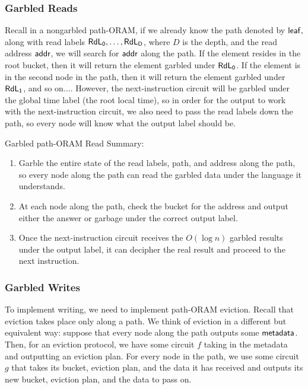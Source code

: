 \subsubsection{Garbled Reads}
Recall in a nongarbled path-ORAM, if we already know the path denoted by $\mathsf{leaf},$ along with read labels $\mathsf{RdL_0},\dots,\mathsf{RdL_D}$, where $D$ is the depth, and the read address $\mathsf{addr}$, we will search for $\mathsf{addr}$ along the path.
If the element resides in the root bucket, then it will return the element garbled under $\mathsf{RdL_0}$. If the element is in the second node in the path, then it will return the element garbled under $\mathsf{RdL_1}$, and so on$\dots$.
However, the next-instruction circuit will be garbled under the global time label (the root local time), so in order for the output to work with the next-instruction circuit, we also need to pass the read labels down the path, so every node will know what the output label should be.
\begin{mdframed}[innertopmargin=5pt, skipabove=\topskip, skipbelow=\topskip,align=left,nobreak=true]
Garbled path-ORAM Read Summary:
\begin{enumerate}
    \item Garble the entire state of the read labels, path, and address along the path, so every node along the path can read the garbled data under the language it understands.
    \item At each node along the path,  check the bucket for the address and output either the answer or garbage under the correct output label.
    \item Once the next-instruction circuit receives the $O(\log n)$ garbled results under the output label, it can decipher the real result and proceed to the next instruction.
    \end{enumerate}
\end{mdframed}

\subsubsection{Garbled Writes}
To implement writing, we need to implement path-ORAM eviction.
Recall that eviction takes place only along a path.
We think of eviction in a different but equivalent way: suppose that every node along the path outputs some $\mathsf{metadata}$. 
Then, for an eviction protocol, we have some circuit $f$ taking in the metadata and outputting an eviction plan.
For every node in the path, we use some circuit $g$ that takes its bucket, eviction plan, and the data it has received and outputs its new bucket, eviction plan, and the data to pass on.

